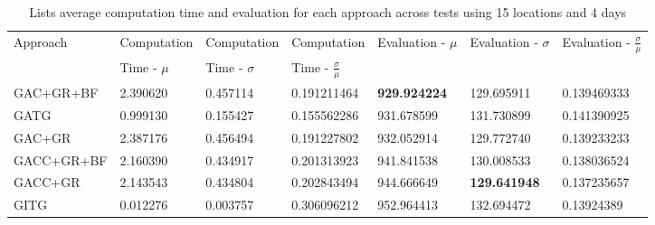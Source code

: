 \begin{table}[H]
    \centering
    \caption{Lists average computation time and evaluation for each approach across tests using 15 locations and 4 days}\label{tab:averages-15-locations-4-days}
    \scriptsize
    \begin{tabular}{lllllll}
        Approach   & Computation  & Computation & Computation & Evaluation - $\mu$ & Evaluation - $\sigma$ & Evaluation - $\frac{\sigma}{\mu}$ \\
                   & Time - $\mu$ & Time - $\sigma$ & Time - $\frac{\sigma}{\mu}$ & & & \\
        GAC+GR+BF  & 2.390620                                                            & 0.457114                                                              & 0.191211464                                                                        & \textbf{929.924224}  & 129.695911            & 0.139469333                       \\
        GATG       & 0.999130                                                            & 0.155427                                                              & 0.155562286                                                                        & 931.678599           & 131.730899            & 0.141390925                       \\
        GAC+GR     & 2.387176                                                            & 0.456494                                                              & 0.191227802                                                                        & 932.052914           & 129.772740            & 0.139233233                       \\
        GACC+GR+BF & 2.160390                                                            & 0.434917                                                              & 0.201313923                                                                        & 941.841538           & 130.008533            & 0.138036524                       \\
        GACC+GR    & 2.143543                                                            & 0.434804                                                              & 0.202843494                                                                        & 944.666649           & \textbf{129.641948}   & 0.137235657                       \\
        GITG       & 0.012276                                                            & 0.003757                                                              & 0.306096212                                                                        & 952.964413           & 132.694472            & 0.13924389                        \\

\end{tabular}
\end{table}

